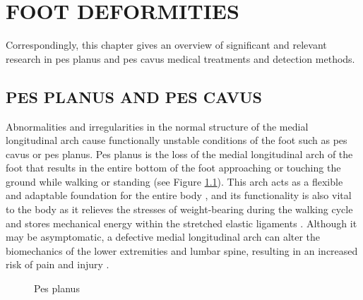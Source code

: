 \chapter{FOOT DEFORMITIES}\label{chp:Feet Deformities}

Correspondingly, this chapter gives an overview of significant and relevant research in pes planus and pes cavus medical treatments and detection methods.

\section{PES PLANUS AND PES CAVUS}

Abnormalities and irregularities in the normal structure of the medial longitudinal arch cause functionally unstable conditions of the foot such as pes cavus or pes planus. Pes planus is the loss of the medial longitudinal arch of the foot that results in the entire bottom of the foot approaching or touching the ground while walking or standing \cite{wozniacka2013body} (see Figure \ref{fig:BackgroundPesPlanus}). This arch acts as a flexible and adaptable foundation for the entire body \cite{kohls2009prevalence}, and its functionality is also vital to the body as it relieves the stresses of weight-bearing during the walking cycle and stores mechanical energy within the stretched elastic ligaments \cite{da1963idiopathic}. Although it may be asymptomatic, a defective medial longitudinal arch can alter the biomechanics of the lower extremities and lumbar spine, resulting in an increased risk of pain and injury \cite{gun2012pes}.

\begin{figure}[htbp]
\centering
{}
\caption{Pes planus \cite{kim2021dynamic}}
\label{fig:BackgroundPesPlanus}
\end{figure}

